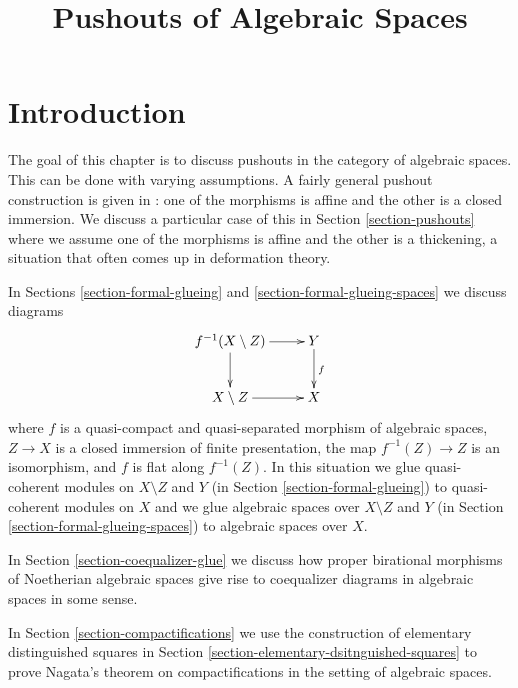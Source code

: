 \documentclass{stacks-project}
\theoremstyle{plain}
\theoremstyle{definition}
\theoremstyle{remark}
\numberwithin{equation}{subsection}
\begin{document}
\title{Pushouts of Algebraic Spaces}


\maketitle

\label{section-phantom}

\tableofcontents

\section{Introduction}
\label{section-introduction}

\noindent
The goal of this chapter is to discuss pushouts in the category of
algebraic spaces. This can be done with varying assumptions.
A fairly general pushout construction is given in \cite{Temkin-Tyomkin}:
one of the morphisms is affine and the other is a closed immersion.
We discuss a particular case of this in Section \ref{section-pushouts}
where we assume one of the morphisms is affine and the other is a
thickening, a situation that often comes up in deformation theory.

\medskip\noindent
In Sections \ref{section-formal-glueing} and
\ref{section-formal-glueing-spaces} we discuss diagrams
$$
\xymatrix{
f^{-1}(X \setminus Z) \ar[r] \ar[d] & Y \ar[d]^f \\
X \setminus Z \ar[r] & X
}
$$
where $f$ is a quasi-compact and quasi-separated morphism of
algebraic spaces, $Z \to X$ is a closed immersion of finite presentation,
the map $f^{-1}(Z) \to Z$ is an isomorphism, and
$f$ is flat along $f^{-1}(Z)$. In this situation we glue
quasi-coherent modules on $X \setminus Z$ and $Y$
(in Section \ref{section-formal-glueing}) to quasi-coherent modules on $X$
and we glue algebraic spaces over $X \setminus Z$ and $Y$
(in Section \ref{section-formal-glueing-spaces}) to algebraic spaces over $X$.

\medskip\noindent
In Section \ref{section-coequalizer-glue} we discuss how proper birational
morphisms of Noetherian algebraic spaces give rise to coequalizer diagrams
in algebraic spaces in some sense.

\medskip\noindent
In Section \ref{section-compactifications} we use the construction
of elementary distinguished squares
in Section \ref{section-elementary-dsitnguished-squares}
to prove Nagata's theorem on compactifications in the setting
of algebraic spaces.
\end{document}
